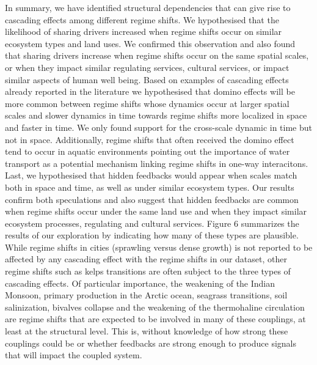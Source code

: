 \documentclass[9pt,]{article}
\begin{document}
In summary, we have identified structural dependencies that can give
rise to cascading effects among different regime shifts. We hypothesised
that the likelihood of sharing drivers increased when regime shifts
occur on similar ecosystem types and land uses. We confirmed this
observation and also found that sharing drivers increase when regime
shifts occur on the same spatial scales, or when they impact similar
regulating services, cultural services, or impact similar aspects of
human well being. Based on examples of cascading effects already
reported in the literature we hypothesised that domino effects will be
more common between regime shifts whose dynamics occur at larger spatial
scales and slower dynamics in time towards regime shifts more localized
in space and faster in time. We only found support for the cross-scale
dynamic in time but not in space. Additionally, regime shifts that often
received the domino effect tend to occur in aquatic environments
pointing out the importance of water transport as a potential mechanism
linking regime shifts in one-way interacitons. Last, we hypothesised
that hidden feedbacks would appear when scales match both in space and
time, as well as under similar ecosystem types. Our results confirm both
speculations and also suggest that hidden feedbacks are common when
regime shifts occur under the same land use and when they impact similar
ecosystem processes, regulating and cultural services. Figure 6
summarizes the results of our exploration by indicating how many of
these types are plausible. While regime shifts in cities (sprawling
versus dense growth) is not reported to be affected by any cascading
effect with the regime shifts in our dataset, other regime shifts such
as kelps transitions are often subject to the three types of cascading
effects. Of particular importance, the weakening of the Indian Monsoon,
primary production in the Arctic ocean, seagrass transitions, soil
salinization, bivalves collapse and the weakening of the thermohaline
circulation are regime shifts that are expected to be involved in many
of these couplings, at least at the structural level. This is, without
knowledge of how strong these couplings could be or whether feedbacks
are strong enough to produce signals that will impact the coupled
system.
\end{document}
